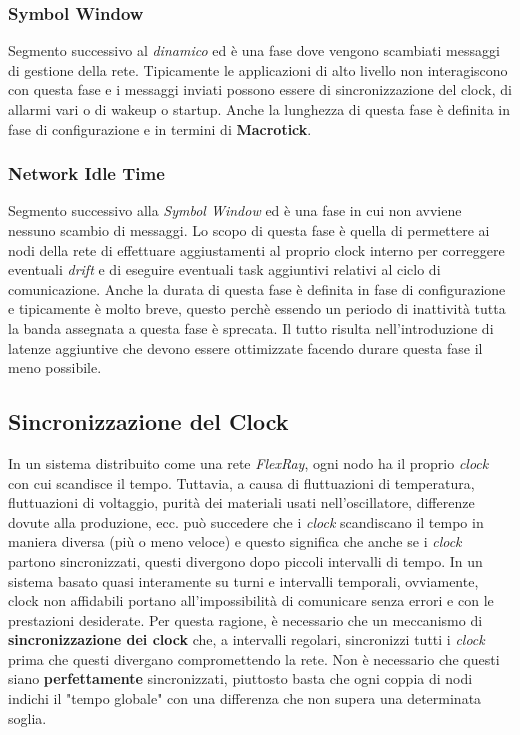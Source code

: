 \subsubsection{Symbol Window}
Segmento successivo al \emph{dinamico} ed è una fase dove vengono scambiati messaggi di gestione della rete. Tipicamente le applicazioni di alto livello non interagiscono con questa fase \cite{ni_flexray} e i messaggi inviati possono essere di sincronizzazione del clock, di allarmi vari o di wakeup o startup. Anche la lunghezza di questa fase è definita in fase di configurazione e in termini di \textbf{Macrotick}.

\subsubsection{Network Idle Time}
Segmento successivo alla \emph{Symbol Window} ed è una fase in cui non avviene nessuno scambio di messaggi. Lo scopo di questa fase è quella di permettere ai nodi della rete di effettuare aggiustamenti al proprio clock interno per correggere eventuali \emph{drift} e di eseguire eventuali task aggiuntivi relativi al ciclo di comunicazione. Anche la durata di questa fase è definita in fase di configurazione e tipicamente è molto breve, questo perchè essendo un periodo di inattività tutta la banda assegnata a questa fase è sprecata. Il tutto risulta nell'introduzione di latenze aggiuntive che devono essere ottimizzate facendo durare questa fase il meno possibile. \cite{flexray_specification}

\subsection{Sincronizzazione del Clock}
In un sistema distribuito come una rete \emph{FlexRay}, ogni nodo ha il proprio \emph{clock} con cui scandisce il tempo. Tuttavia, a causa di fluttuazioni di temperatura, fluttuazioni di voltaggio, purità dei materiali usati nell'oscillatore, differenze dovute alla produzione, ecc. può succedere che i \emph{clock} scandiscano il tempo in maniera diversa (più o meno veloce) e questo significa che anche se i \emph{clock} partono sincronizzati, questi divergono dopo piccoli intervalli di tempo. In un sistema basato quasi interamente su turni e intervalli temporali, ovviamente, clock non affidabili portano all'impossibilità di comunicare senza errori e con le prestazioni desiderate. Per questa ragione, è necessario che un meccanismo di \textbf{sincronizzazione dei clock} che, a intervalli regolari, sincronizzi tutti i \emph{clock} prima che questi divergano compromettendo la rete. Non è necessario che questi siano \textbf{perfettamente} sincronizzati, piuttosto basta che ogni coppia di nodi indichi il "tempo globale" con una differenza che non supera una determinata soglia. \cite{flexray_specification}


